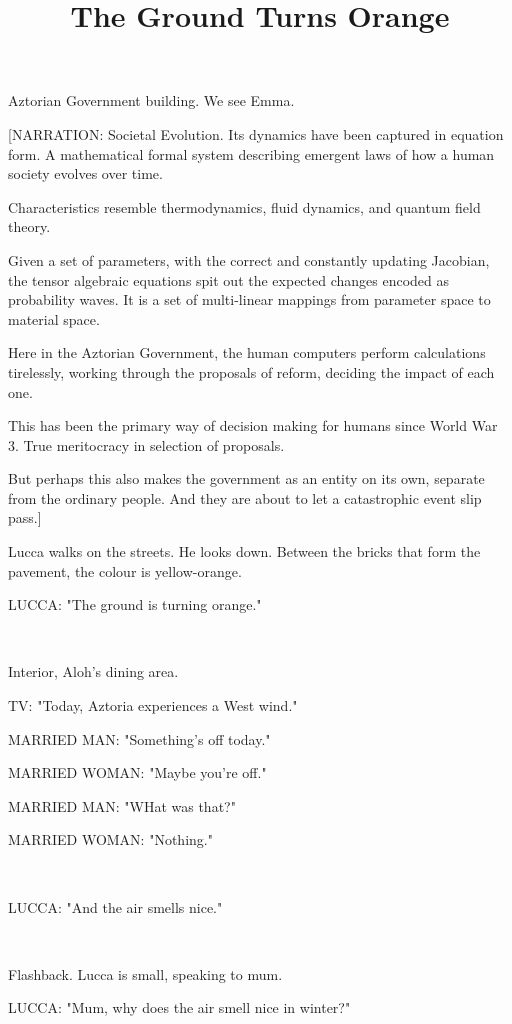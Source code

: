 \documentclass[11pt]{article}
\begin{document}
\ttfamily
\title{The Ground Turns Orange}
\maketitle

Aztorian Government building.
We see Emma.

[NARRATION: Societal Evolution. Its dynamics have been captured in equation form.
A mathematical formal system describing emergent laws of how a human society evolves over time. 

Characteristics resemble thermodynamics, fluid dynamics, and quantum field theory.

Given a set of parameters, with the correct and constantly updating Jacobian, the tensor algebraic equations spit out the expected changes encoded as probability waves.
It is a set of multi-linear mappings from parameter space to material space.

Here in the Aztorian Government, the human computers perform calculations tirelessly, working through the proposals of reform, deciding the impact of each one.

This has been the primary way of decision making for humans since World War 3.
True meritocracy in selection of proposals.

But perhaps this also makes the government as an entity on its own, separate from the ordinary people.
And they are about to let a catastrophic event slip pass.]

Lucca walks on the streets.
He looks down. 
Between the bricks that form the pavement, the colour is yellow-orange.

LUCCA: "The ground is turning orange."

\ 

Interior, Aloh's dining area.

TV: "Today, Aztoria experiences a West wind."

MARRIED MAN: "Something's off today."

MARRIED WOMAN: "Maybe you're off."

MARRIED MAN: "WHat was that?"

MARRIED WOMAN: "Nothing."

\ 

LUCCA: "And the air smells nice."

\ 

Flashback.
Lucca is small, speaking to mum.

LUCCA: "Mum, why does the air smell nice in winter?"
\end{document}
